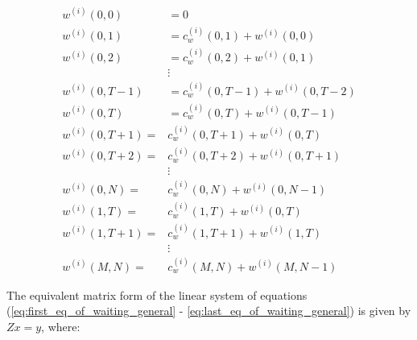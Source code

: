 \begin{align}
    w^{(i)}(0, 0) &= 0 \label{eq:first_eq_of_waiting_general} \\
    w^{(i)}(0, 1) &= c^{(i)}_w(0,1) + w^{(i)}(0,0) \\
    w^{(i)}(0, 2) &= c^{(i)}_w(0,2) + w^{(i)}(0,1) \\
    & \vdots \nonumber \\
    w^{(i)}(0, T-1) &= c^{(i)}_w(0,T-1) + w^{(i)}(0,T-2) \\
    w^{(i)}(0, T) &= c^{(i)}_w(0, T) + w^{(i)}(0, T - 1) \\
    w^{(i)}(0, T + 1) =& c^{(i)}_w(0, T + 1) + w^{(i)}(0, T) \\
    w^{(i)}(0, T + 2) =& c^{(i)}_w(0, T + 2) + w^{(i)}(0, T + 1) \\
    & \vdots \nonumber \\
    w^{(i)}(0, N) =& c^{(i)}_w(0, N) + w^{(i)}(0, N - 1) \\
    w^{(i)}(1, T) =& c^{(i)}_w(1, T) + w^{(i)}(0, T) \\
    w^{(i)}(1, T + 1) =& c^{(i)}_w(1, T + 1) + w^{(i)}(1, T) \\
    & \vdots \nonumber \\
    w^{(i)}(M, N) =& c^{(i)}_w(M, N) + w^{(i)}(M, N-1)
    \label{eq:last_eq_of_waiting_general}
\end{align}

The equivalent matrix form of the linear system of equations
(\ref{eq:first_eq_of_waiting_general} - \ref{eq:last_eq_of_waiting_general})
is given by \(Zx=y\), where:

\newcommand{\allthedots}{\vdots & \vdots & \vdots & \ddots & \vdots & \vdots &
\vdots & \vdots & \ddots & \vdots & \vdots & \vdots & \ddots & \vdots}


